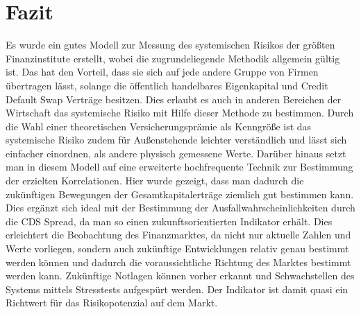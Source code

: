 \documentclass[a4paper,12pt]{scrartcl}
\begin{document}
\section{Fazit}
Es wurde ein gutes Modell zur Messung des systemischen Risikos der größten Finanzinstitute erstellt, wobei die zugrundeliegende Methodik allgemein gültig ist. Das hat den Vorteil, dass sie sich auf jede andere Gruppe von Firmen übertragen lässt, solange die öffentlich handelbares Eigenkapital und Credit Default Swap Verträge besitzen. Dies erlaubt es auch in anderen Bereichen der Wirtschaft das systemische Risiko mit Hilfe dieser Methode zu bestimmen.
Durch die Wahl einer theoretischen Versicherungsprämie als Kenngröße ist das systemische Risiko zudem für Außenstehende leichter verständlich und lässt sich einfacher einordnen, als andere physisch gemessene Werte.
Darüber hinaus setzt man in diesem Modell auf eine erweiterte hochfrequente Technik zur Bestimmung der erzielten Korrelationen. Hier wurde gezeigt, dass man dadurch die zukünftigen Bewegungen der Gesamtkapitalerträge ziemlich gut bestimmen kann. Dies ergänzt sich ideal mit der Bestimmung der Ausfallwahrscheinlichkeiten durch die CDS Spread, da man so einen zukunftsorientierten Indikator erhält.
Dies erleichtert die Beobachtung des Finanzmarktes, da nicht nur aktuelle Zahlen und Werte vorliegen, sondern auch zukünftige Entwicklungen relativ genau bestimmt werden können und dadurch die voraussichtliche Richtung des Marktes bestimmt werden kann. Zukünftige Notlagen können vorher erkannt und Schwachstellen des Systems mittels Stresstests aufgespürt werden. Der Indikator ist damit quasi ein Richtwert für das Risikopotenzial auf dem Markt.


\newpage

\end{document}
